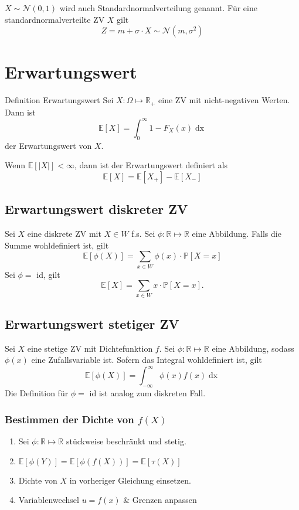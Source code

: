 \documentclass[a4paper,10pt]{article}
\def\R{\mathbb{R}}
\def\P{\mathbb{P}}
\def\E{\mathbb{E}}
\begin{document}
\(X \sim \mathcal{N}(0,1)\) wird auch Standardnormalverteilung genannt. Für eine standardnormalverteilte ZV \(X\) gilt
\[Z = m +\sigma \cdot X \sim \mathcal{N}(m, \sigma^2)\]

\section{Erwartungswert}
\begin{mainbox}{Definition Erwartungswert}
	Sei \(X: \Omega \mapsto \R_+\) eine ZV mit nicht-negativen Werten. Dann ist
	\[\E[X] = \int_0^\infty 1- F_X(x) \mathop{dx}\]
	der Erwartungswert von \(X\).
\end{mainbox}
Wenn \(\E[|X|] < \infty\), dann ist der Erwartungswert definiert als
\[\E[X] = \E[X_+] - \E[X_-]\]

\subsection{Erwartungswert diskreter ZV}
Sei \(X\) eine diskrete ZV mit \(X \in W\) f.s. Sei \(\phi: \R \mapsto \R\) eine Abbildung. Falls die Summe wohldefiniert ist, gilt
\[\E[\phi(X)] = \sum_{x\in W} \phi(x)\cdot \P[X=x]\]
Sei \(\phi = \) id, gilt
\[
	\E[X] = \sum_{x\in W} x \cdot \P[X=x]
.\] 

\subsection{Erwartungswert stetiger ZV}
Sei \(X\) eine stetige ZV mit Dichtefunktion \(f\). Sei \(\phi :\R\mapsto \R\) eine Abbildung, sodass \(\phi(x)\) eine Zufallsvariable ist. Sofern das Integral wohldefiniert ist, gilt
\[\E[\phi(X)] = \int_{-\infty}^{\infty}\phi(x)f(x) \mathop{dx}\]
Die Definition für \(\phi = \) id ist analog zum diskreten Fall.
\subsubsection{\texorpdfstring{Bestimmen der Dichte von \(f(X)\)}{Bestimmen der Dichte von f(X)}}
\begin{enumerate}
	\item Sei \(\phi: \R \mapsto \R\) stückweise beschränkt und stetig.
	\item \(\E[\phi(Y)] = \E[\phi(f(X))] = \E[\tau(X)]\)
	\item Dichte von \(X\) in vorheriger Gleichung einsetzen.
	\item Variablenwechsel \(u = f(x)\) \& Grenzen anpassen
\end{enumerate}
\end{document}

